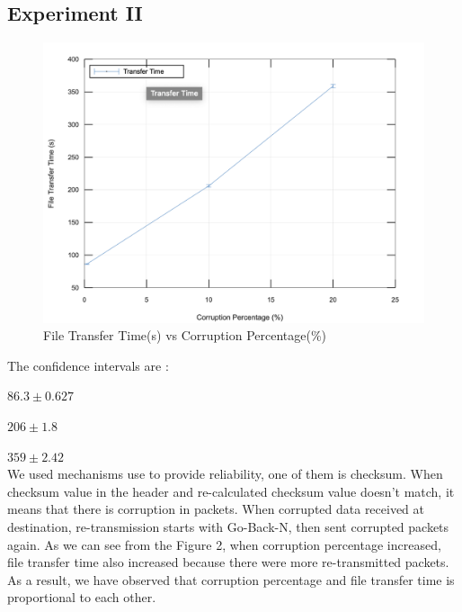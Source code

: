 \subsection{Experiment II}
\begin{figure}[ht]
   \centering
   \includegraphics[scale=.45]{images/exp2.png}
    \caption{File Transfer Time(s) vs Corruption Percentage(\%)}
    \label{fig:topology}
\end{figure}
The confidence intervals are :

$86.3 \pm 0.627$

$206 \pm 1.8$

$359 \pm 2.42$\\
We used mechanisms use to provide reliability, one of them is checksum. When checksum value in the header and re-calculated checksum value doesn't match, it means that there is corruption in packets. When corrupted data received at destination, re-transmission starts with Go-Back-N, then sent corrupted packets again. As we can see from the Figure 2, when corruption percentage increased, file transfer time also increased because there were more re-transmitted packets. As a result, we have observed that corruption percentage and file transfer time is proportional to each other.
